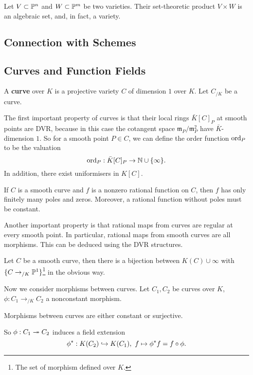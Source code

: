 Let $V\subset \P^n$ and $W\subset \P^m$ be two varieties.
Their set-theoretic product $V\times W$ is an algebraic set, and, in fact, a variety.

\subsection{Connection with Schemes}

\subsection{Curves and Function Fields}
A \textbf{curve} over $K$ is a projective variety $C$ of dimension $1$ over $K$. Let $C_{/K}$ be a curve.

The first important property of curves is that their local rings $\bar{K}[C]_P$ at smooth points are DVR, because in this case the cotangent space $\mathfrak{m}_P/\mathfrak{m}_P^2$ have $\bar{K}$-dimension $1$.
So for a smooth point $P\in C$, we can define the order function $\ord_P$ to be the valuation \[\ord_P : \bar{K}[C]_P \to\N\cup\{\infty\}.\]
In addition, there exist uniformisers in $K[C]$.

\begin{proposition}
    If $C$ is a smooth curve and $f$ is a nonzero rational function on $C$, then $f$ has only finitely many poles and zeros.
    Moreover, a rational function without poles must be constant.
\end{proposition}

Another important property is that rational maps from curves are regular at every smooth point. In particular, rational maps from smooth curves are all morphisms. This can be deduced using the DVR structures.
\begin{example}
    Let $C$ be a smooth curve, then there is a bijection between $K(C)\cup{\infty}$ with $\{C\to_{/K}\P^1\}$\footnote{The set of morphism defined over $K$.} in the obvious way.
\end{example}

Now we consider morphisms between curves. Let $C_1, C_2$ be curves over $K$, $\phi : C_1\to_{/K}C_2$ a nonconstant morphism.
\begin{theorem}
    Morphisms between curves are either constant or surjective.
\end{theorem}
So $\phi : C_1\surject C_2$ induces a field extension \[\phi^* : K(C_2)\inject K(C_1),\ f \mapsto \phi^*f = f\circ \phi.\]

